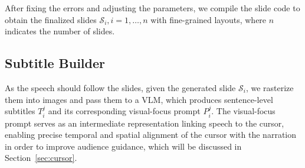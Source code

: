 After fixing the errors and adjusting the parameters, we compile the slide code to obtain the finalized slides $\mathcal{S}_i,i=1,\dots,n$ with fine-grained layouts, where $n$ indicates the number of slides.



\vspace{-0.4\baselineskip} 
\subsection{Subtitle Builder}
\vspace{-0.4\baselineskip} 
As the speech should follow the slides, given the generated slide $\mathcal{S}_i$, we rasterize them into images and pass them to a VLM, which produces sentence-level subtitles $T_{i}^{j}$ and its corresponding visual-focus prompt $P_{i}^{j}$. The visual-focus prompt serves as an intermediate representation linking speech to the cursor, enabling precise temporal and spatial alignment of the cursor with the narration in order to improve audience guidance, which will be discussed in Section~\ref{sec:cursor}.

\vspace{-0.5\baselineskip} 
